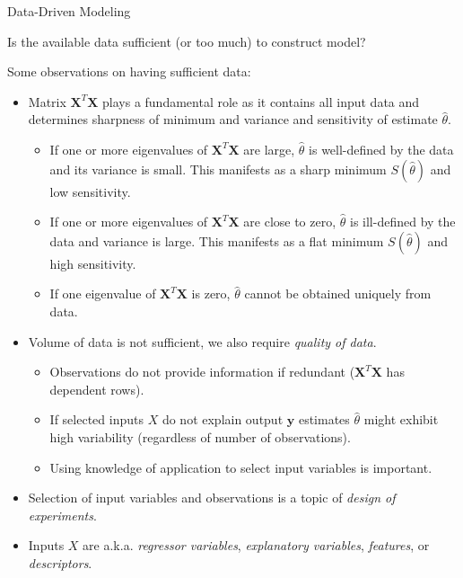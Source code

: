 \documentclass[handout,9pt]{beamer}
\begin{document}
%
\begin{frame}{Data-Driven Modeling}

\begin{block}{}
Is the available data sufficient (or too much) to construct model?
\end{block}
Some observations on having sufficient data:
\begin{itemize}
\setlength{\itemsep}{5pt}
\item Matrix $\mathbf{X}^T\mathbf{X}$ plays a fundamental role as it contains all input data and determines  sharpness of minimum and variance and sensitivity of estimate $\hat{\theta}$. 

\begin{itemize}
\setlength{\itemsep}{5pt}
\item If one or more eigenvalues of $\mathbf{X}^T\mathbf{X}$ are large, $\hat{\theta}$ is well-defined by the data and its variance is small.  This manifests as a sharp minimum $S(\hat{\theta})$ and low sensitivity.
\item If one or more eigenvalues of $\mathbf{X}^T\mathbf{X}$ are close to zero, $\hat{\theta}$ is ill-defined by the data and variance is large. This manifests as a flat minimum $S(\hat{\theta})$ and high sensitivity.
\item If one eigenvalue of $\mathbf{X}^T\mathbf{X}$ is zero, $\hat{\theta}$ cannot be obtained uniquely from data.  
\end{itemize}
\item Volume of data is not sufficient, we also require {\em quality of data}. 

\begin{itemize}
\setlength{\itemsep}{5pt}
\item Observations do not provide information if redundant ($\mathbf{X}^T\mathbf{X}$ has dependent rows). 
\item If selected inputs $X$ do not explain output $\mathbf{y}$ estimates $\hat{\theta}$ might exhibit high variability (regardless of number of observations). 
\item Using knowledge of application to select input variables is important.  
\end{itemize}
\item Selection of input variables and observations is a topic of {\em design of experiments}. 
\item Inputs $X$ are a.k.a. {\em regressor variables}, {\em explanatory variables}, {\em features}, or {\em descriptors}. 
\end{itemize}

\end{frame}
\end{document}
